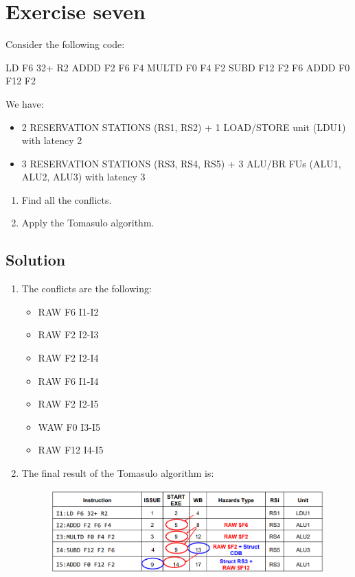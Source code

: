 \section{Exercise seven}

Consider the following code: 
\begin{verbnobox}[\verbarg]
LD F6 32+ R2
ADDD F2 F6 F4
MULTD F0 F4 F2
SUBD F12 F2 F6
ADDD F0 F12 F2
\end{verbnobox}
We have: 
\begin{itemize}
    \item 2 RESERVATION STATIONS (RS1, RS2) + 1 LOAD/STORE unit (LDU1) with latency 2
    \item 3 RESERVATION STATIONS (RS3, RS4, RS5) + 3 ALU/BR FUs (ALU1, ALU2, ALU3)    with latency 3
\end{itemize}
\begin{enumerate}
    \item Find all the conflicts. 
    \item Apply the Tomasulo algorithm. 
\end{enumerate}

\subsection*{Solution}
\begin{enumerate}
    \item The conflicts are the following: 
        \begin{itemize}
            \item RAW F6 I1-I2
            \item RAW F2 I2-I3
            \item RAW F2 I2-I4
            \item RAW F6 I1-I4
            \item RAW F2 I2-I5
            \item WAW F0 I3-I5
            \item RAW F12 I4-I5
        \end{itemize}
    \item The final result of the Tomasulo algorithm is: 
        \begin{figure}[H]
            \centering
            \includegraphics[width=1\linewidth]{images/tom.png}
        \end{figure}
\end{enumerate}